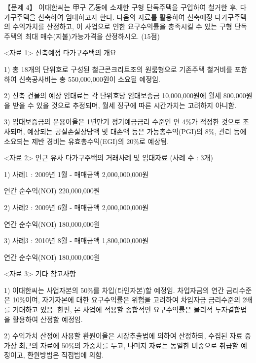 \begin{longquestion}{【문제 4】}
이대한씨는 甲구 乙동에 소재한 구형 단독주택을 구입하여 철거한 후, 다가구주택을 신축하여 임대하고자 한다. 다음의 자료를 활용하여 신축예정 다가구주택의 수익가치를 산정하고, 이 사업으로 인한 요구수익률을 충족시킬 수 있는 구형 단독주택의 최대 매수(지불)가능가격을 산정하시오. (15점) \par
<자료 1> 신축예정 다가구주택의 개요 \par
1) 총 18개의 단위호로 구성된 철근콘크리트조의 원룸형으로 기존주택 철거비를 포함하여 신축공사비는 총 550,000,000원이 소요될 예정임. \par
2) 신축 건물의 예상 임대료는 각 단위호당 임대보증금 10,000,000원에 월세 800,000원을 받을 수 있을 것으로 추정되며, 월세 징구에 따른 시간가치는 고려하지 아니함. \par
3) 임대보증금의 운용이율은 1년만기 정기예금금리 수준인 연 4\%가 적정한 것으로 조사되며, 예상되는 공실손실상당액 및 대손액 등은 가능총수익(PGI)의 8\%, 관리 등에 소요되는 제반 경비는 유효총수익(EGI)의 20\%로 예상됨. \par
<자료 2> 인근 유사 다가구주택의 거래사례 및 임대자료 (사례 수 : 3개) \par
1) 사례1 : 2009년 1월 - 매매금액 2,000,000,000원 \par
연간 순수익(NOI) 220,000,000원 \par
2) 사례2 : 2009년 6월 - 매매금액 2,000,000,000원 \par
연간 순수익(NOI) 180,000,000원 \par
3) 사례3 : 2010년 8월 - 매매금액 1,800,000,000원 \par
연간 순수익(NOI) 180,000,000원 \par
<자료 3> 기타 참고사항 \par
1) 이대한씨는 사업자본의 50\%를 차입(타인자본)할 예정임. 차입자금의 연간 금리수준은 10\%이며, 자기자본에 대한 요구수익률은 위험을 고려하여 차입자금 금리수준의 2배를 기대하고 있음. 한편, 본 사업에 적용할 종합적인 요구수익률은 물리적 투자결합법을 활용하여 산정할 예정임. \par
2) 수익가치 산정에 사용할 환원이율은 시장추출법에 의하여 산정하되, 수집된 자료 중 가장 최근의 자료에 50\%의 가중치를 두고, 나머지 자료는 동일한 비중으로 취급할 예정이고, 환원방법은 직접법에 의함. \par
\end{longquestion}
